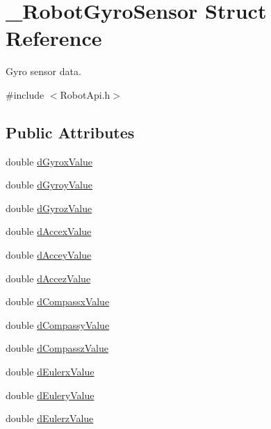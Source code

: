 \hypertarget{struct__RobotGyroSensor}{\section{\-\_\-\-Robot\-Gyro\-Sensor Struct Reference}
\label{struct__RobotGyroSensor}
}


Gyro sensor data.  




{\ttfamily \#include $<$Robot\-Api.\-h$>$}

\subsection*{Public Attributes}
\begin{DoxyCompactItemize}
\item 
double \hyperlink{struct__RobotGyroSensor_a91d4a3ae87bab30dfcd0338249e435f4}{d\-Gyrox\-Value}
\item 
double \hyperlink{struct__RobotGyroSensor_a680c6b5d38816f4ec00b17da210d232a}{d\-Gyroy\-Value}
\item 
double \hyperlink{struct__RobotGyroSensor_a7294f5008f4215b13022d0f2e467d699}{d\-Gyroz\-Value}
\item 
double \hyperlink{struct__RobotGyroSensor_a97eb6256affeaa07f5ab6f395d5c1920}{d\-Accex\-Value}
\item 
double \hyperlink{struct__RobotGyroSensor_a1a4ef02d86889de34db54eac401ad877}{d\-Accey\-Value}
\item 
double \hyperlink{struct__RobotGyroSensor_a85a5d81f93840612f5cf45bef4281f8e}{d\-Accez\-Value}
\item 
double \hyperlink{struct__RobotGyroSensor_aa6563418e0328d8ced1004a74ec4f4c1}{d\-Compassx\-Value}
\item 
double \hyperlink{struct__RobotGyroSensor_aead0ecac12a78d2112621fd4c308c031}{d\-Compassy\-Value}
\item 
double \hyperlink{struct__RobotGyroSensor_a752fbdd33849fcf1d893f53f502d7a0d}{d\-Compassz\-Value}
\item 
double \hyperlink{struct__RobotGyroSensor_aa5c27e7d7f4938e185b557b547419b51}{d\-Eulerx\-Value}
\item 
double \hyperlink{struct__RobotGyroSensor_a4d3b6fdf22b51d73bf89936aa3e80dc5}{d\-Eulery\-Value}
\item 
double \hyperlink{struct__RobotGyroSensor_a3bae147fe452610da4be3b125e28ea21}{d\-Eulerz\-Value}
\end{DoxyCompactItemize}


